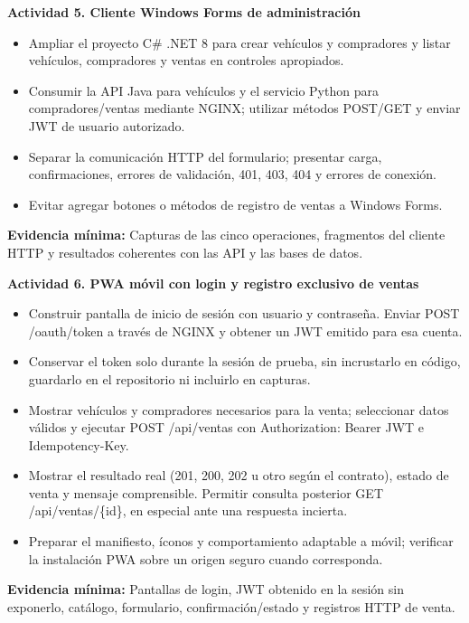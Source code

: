 \documentclass[11pt,a4paper]{article}
\renewcommand{\_}{\oldunderscore\allowbreak}
\begin{document}
\vspace{0.2cm}

\noindent\textbf{Actividad 5. Cliente Windows Forms de administración}
\begin{itemize}[leftmargin=*,itemsep=2pt,topsep=2pt]
  \item Ampliar el proyecto C\# .NET 8 para crear vehículos y compradores y listar vehículos, compradores y ventas en controles apropiados.
  \item Consumir la API Java para vehículos y el servicio Python para compradores/ventas mediante NGINX; utilizar métodos POST/GET y enviar JWT de usuario autorizado.
  \item Separar la comunicación HTTP del formulario; presentar carga, confirmaciones, errores de validación, 401, 403, 404 y errores de conexión.
  \item Evitar agregar botones o métodos de registro de ventas a Windows Forms.
\end{itemize}
\textbf{Evidencia mínima:} Capturas de las cinco operaciones, fragmentos del cliente HTTP y resultados coherentes con las API y las bases de datos.

\vspace{0.2cm}

\noindent\textbf{Actividad 6. PWA móvil con login y registro exclusivo de ventas}
\begin{itemize}[leftmargin=*,itemsep=2pt,topsep=2pt]
  \item Construir pantalla de inicio de sesión con usuario y contraseña. Enviar POST /oauth/token a través de NGINX y obtener un JWT emitido para esa cuenta.
  \item Conservar el token solo durante la sesión de prueba, sin incrustarlo en código, guardarlo en el repositorio ni incluirlo en capturas.
  \item Mostrar vehículos y compradores necesarios para la venta; seleccionar datos válidos y ejecutar POST /api/ventas con Authorization: Bearer JWT e Idempotency-Key.
  \item Mostrar el resultado real (201, 200, 202 u otro según el contrato), estado de venta y mensaje comprensible. Permitir consulta posterior GET /api/ventas/\{id\}, en especial ante una respuesta incierta.
  \item Preparar el manifiesto, íconos y comportamiento adaptable a móvil; verificar la instalación PWA sobre un origen seguro cuando corresponda.
\end{itemize}
\textbf{Evidencia mínima:} Pantallas de login, JWT obtenido en la sesión sin exponerlo, catálogo, formulario, confirmación/estado y registros HTTP de venta.
\end{document}
